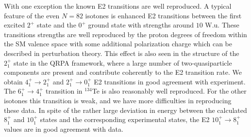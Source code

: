 With one exception the known E2 transitions are well reproduced.
A  typical feature of the even $N=82$ isotones is enhanced E2 
transitions between the first excited $2^{+}$ state and the $0^{+}$ 
ground state with strengths around $10$ W.u. 
These transitions strengths are well reproduced  by the proton degrees of freedom 
within the SM valence space with some additional polarization charge which can be described 
in perturbation theory.  
This effect is  also seen in the structure of the $2^{+}_{1}$ state in the QRPA framework, 
where a large number of 
two-quasiparticle components are present and contribute coherently
to the E2 transition rate.
We obtain $4^{+}_{1} \rightarrow 2^{+}_{1}$ and 
$2^{+}_{1} \rightarrow 0^{+}_{1}$ E2 transitions in good agreement with 
experiment. The $6^{+}_{1} \rightarrow 4^{+}_{1}$ transition in $^{134}$Te is 
also reasonably well reproduced. For the other isotones this transition is 
weak, and we have more difficulties in reproducing these data.
In spite of the rather large deviation in energy between the calculated 
$8^{+}_{1}$ and $10^{+}_{1}$ states and the corresponding experimental states, 
the E2 $10^{+}_{1} \rightarrow 8^{+}_{1}$ values are in good agreement with 
data.

